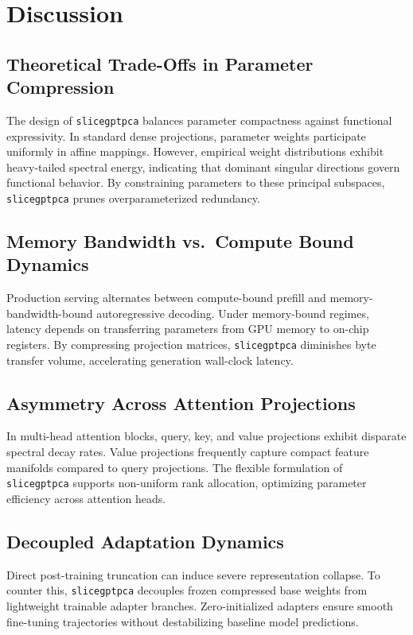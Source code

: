 \section{Discussion}

\subsection{Theoretical Trade-Offs in Parameter Compression}
The design of \texttt{slicegptpca} balances parameter compactness against functional expressivity. In standard dense projections, parameter weights participate uniformly in affine mappings. However, empirical weight distributions exhibit heavy-tailed spectral energy, indicating that dominant singular directions govern functional behavior. By constraining parameters to these principal subspaces, \texttt{slicegptpca} prunes overparameterized redundancy.

\subsection{Memory Bandwidth vs.\ Compute Bound Dynamics}
Production serving alternates between compute-bound prefill and memory-bandwidth-bound autoregressive decoding. Under memory-bound regimes, latency depends on transferring parameters from GPU memory to on-chip registers. By compressing projection matrices, \texttt{slicegptpca} diminishes byte transfer volume, accelerating generation wall-clock latency.

\subsection{Asymmetry Across Attention Projections}
In multi-head attention blocks, query, key, and value projections exhibit disparate spectral decay rates. Value projections frequently capture compact feature manifolds compared to query projections. The flexible formulation of \texttt{slicegptpca} supports non-uniform rank allocation, optimizing parameter efficiency across attention heads.

\subsection{Decoupled Adaptation Dynamics}
Direct post-training truncation can induce severe representation collapse. To counter this, \texttt{slicegptpca} decouples frozen compressed base weights from lightweight trainable adapter branches. Zero-initialized adapters ensure smooth fine-tuning trajectories without destabilizing baseline model predictions.

